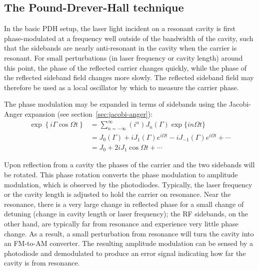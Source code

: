 \subsection{The Pound-Drever-Hall technique}
In the basic PDH setup, the laser light incident on a resonant cavity
is first phase-modulated at a frequency well outside of the bandwidth
of the cavity, such that the sidebands are nearly anti-resonant in the
cavity when the carrier is resonant.  For small perturbations (in
laser frequency or cavity length) around this point, the phase of the
reflected carrier changes quickly, while the phase of the reflected
sideband field changes more slowly.  The reflected sideband field may
therefore be used as a local oscillator by which to measure the
carrier phase.

The phase modulation may be expanded in terms of sidebands using the
Jacobi-Anger expansion (see section~\ref{sec:jacobi-anger}):
%
\begin{align}
\exp\left\{i\Gamma\cos\Omega t\right\} 
  &= \sum_{n=-\infty}^{\infty} \left(i^n\right)  J_n(\Gamma) \exp\{i n \Omega t\} \\
  &= J_0(\Gamma) + i J_{1}(\Gamma) e^{i\Omega t} - i J_{-1}(\Gamma) e^{i \Omega t}+\cdots \\
  &= J_0 + 2 i J_{1} \cos \Omega t + \cdots
\end{align}

Upon reflection from a cavity the phases of the carrier and the two
sidebands will be rotated.  This phase rotation converts the phase
modulation to amplitude modulation, which is observed by the
photodiodes.  Typically, the laser frequency or the cavity length is
adjusted to hold the carrier on resonance.  Near the resonance, there
is a very large change in reflected phase for a small change of
detuning (change in cavity length or laser frequency); the RF
sidebands, on the other hand, are typically far from resonance and
experience very little phase change.  As a result, a small perturbation
from resonance will turn the cavity into an FM-to-AM converter.  The
resulting amplitude modulation can be sensed by a photodiode and
demodulated to produce an error signal indicating how far the cavity
is from resonance.

